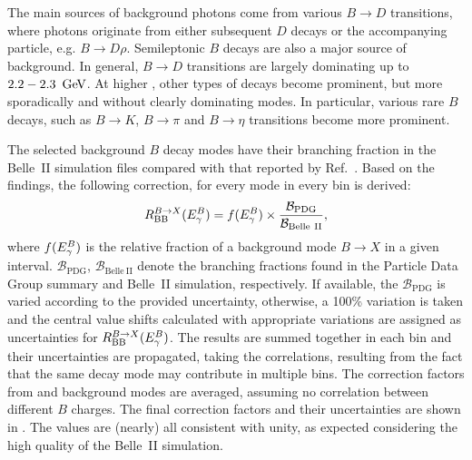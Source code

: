 The main sources of background photons come from various $B\to D$ transitions, where photons originate from either subsequent $D$ decays or the accompanying particle, e.g. $B\to D\rho$.
Semileptonic $B$ decays are also a major source of background.
In general, $B\to D$ transitions are largely dominating up to $2.2-2.3~\mathrm{\,Ge\kern -0.1em V}$.
At higher \EB, other types of decays become prominent, but more sporadically and without clearly dominating modes.
In particular, various rare $B$ decays, such as $B\to K$, $B\to\pi$ and $B\to\eta$ transitions become more prominent.

The selected background $B$ decay modes have their branching fraction in the Belle~II simulation files compared with that reported by Ref.~\cite{Workman:2022ynf}.
Based on the findings, the following correction, for every mode in every \EB bin is derived:
\begin{equation}\label{eq:background_bf_correction}
    R^{B\rightarrow X}_{\mathrm{BB}}({E^B_{\gamma}}) =  f({E^B_{\gamma}}) \times \frac{\mathcal{B}_{\mathrm{PDG}}}{\mathcal{B}_{\mathrm{Belle~II}}},
\end{equation}
where $f({E^B_{\gamma}})$ is the relative fraction of a background mode $B\to X$ in a given \EB interval.
$\mathcal{B}_{\mathrm{PDG}}$, $\mathcal{B}_{\mathrm{Belle~II}}$ denote the branching fractions found in the Particle Data Group summary \cite{Workman:2022ynf} and Belle~II simulation, respectively.
If available, the $\mathcal{B}_{\mathrm{PDG}}$ is varied according to the provided uncertainty, 
otherwise, a 100\% variation is taken and the central value shifts calculated with appropriate variations are assigned as uncertainties for $R^{B\rightarrow X}_{\mathrm{BB}}({E^B_{\gamma}})$.
The results are summed together in each \EB bin and their uncertainties are propagated, taking the correlations, resulting from the fact that the same decay mode may contribute in multiple \EB bins.
The correction factors from \Bp and \Bz background modes are averaged, assuming no correlation between different $B$ charges.
The final correction factors and their uncertainties are shown in .
The values are (nearly) all consistent with unity, as expected considering the high quality of the Belle~II simulation.

